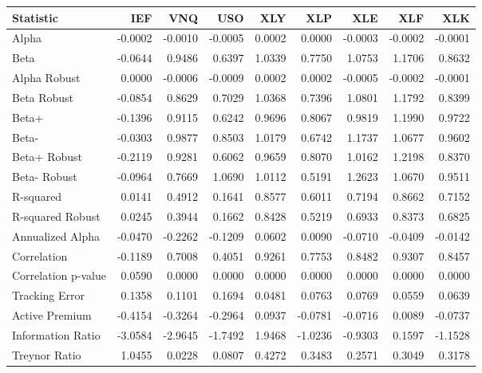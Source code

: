 \begin{tabular}{lrrrrrrrr}
\toprule
Statistic & IEF & VNQ & USO & XLY & XLP & XLE & XLF & XLK \\
\midrule
Alpha & -0.0002 & -0.0010 & -0.0005 & 0.0002 & 0.0000 & -0.0003 & -0.0002 & -0.0001 \\
Beta & -0.0644 & 0.9486 & 0.6397 & 1.0339 & 0.7750 & 1.0753 & 1.1706 & 0.8632 \\
Alpha Robust & 0.0000 & -0.0006 & -0.0009 & 0.0002 & 0.0002 & -0.0005 & -0.0002 & -0.0001 \\
Beta Robust & -0.0854 & 0.8629 & 0.7029 & 1.0368 & 0.7396 & 1.0801 & 1.1792 & 0.8399 \\
Beta+ & -0.1396 & 0.9115 & 0.6242 & 0.9696 & 0.8067 & 0.9819 & 1.1990 & 0.9722 \\
Beta- & -0.0303 & 0.9877 & 0.8503 & 1.0179 & 0.6742 & 1.1737 & 1.0677 & 0.9602 \\
Beta+ Robust & -0.2119 & 0.9281 & 0.6062 & 0.9659 & 0.8070 & 1.0162 & 1.2198 & 0.8370 \\
Beta- Robust & -0.0964 & 0.7669 & 1.0690 & 1.0112 & 0.5191 & 1.2623 & 1.0670 & 0.9511 \\
R-squared & 0.0141 & 0.4912 & 0.1641 & 0.8577 & 0.6011 & 0.7194 & 0.8662 & 0.7152 \\
R-squared Robust & 0.0245 & 0.3944 & 0.1662 & 0.8428 & 0.5219 & 0.6933 & 0.8373 & 0.6825 \\
Annualized Alpha & -0.0470 & -0.2262 & -0.1209 & 0.0602 & 0.0090 & -0.0710 & -0.0409 & -0.0142 \\
Correlation & -0.1189 & 0.7008 & 0.4051 & 0.9261 & 0.7753 & 0.8482 & 0.9307 & 0.8457 \\
Correlation p-value & 0.0590 & 0.0000 & 0.0000 & 0.0000 & 0.0000 & 0.0000 & 0.0000 & 0.0000 \\
Tracking Error & 0.1358 & 0.1101 & 0.1694 & 0.0481 & 0.0763 & 0.0769 & 0.0559 & 0.0639 \\
Active Premium & -0.4154 & -0.3264 & -0.2964 & 0.0937 & -0.0781 & -0.0716 & 0.0089 & -0.0737 \\
Information Ratio & -3.0584 & -2.9645 & -1.7492 & 1.9468 & -1.0236 & -0.9303 & 0.1597 & -1.1528 \\
Treynor Ratio & 1.0455 & 0.0228 & 0.0807 & 0.4272 & 0.3483 & 0.2571 & 0.3049 & 0.3178 \\
\bottomrule
\end{tabular}
